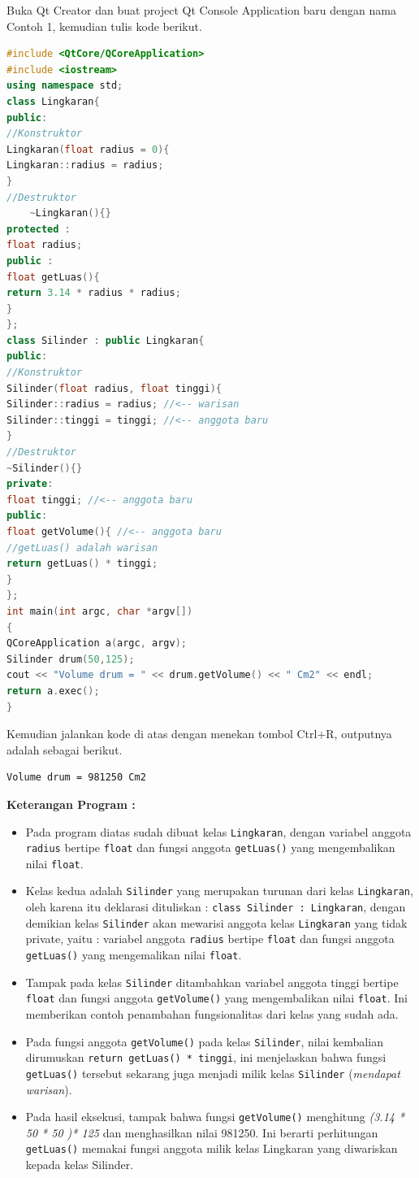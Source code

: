 Buka Qt Creator dan buat project Qt Console Application baru dengan nama
Contoh 1, kemudian tulis kode berikut.

\begin{lstlisting}[language=c++]
#include <QtCore/QCoreApplication>
#include <iostream>
using namespace std;
class Lingkaran{
public:
//Konstruktor
Lingkaran(float radius = 0){
Lingkaran::radius = radius;
}
//Destruktor
    ~Lingkaran(){}
protected :
float radius;
public :
float getLuas(){
return 3.14 * radius * radius;
}
};
class Silinder : public Lingkaran{
public:
//Konstruktor
Silinder(float radius, float tinggi){
Silinder::radius = radius; //<-- warisan
Silinder::tinggi = tinggi; //<-- anggota baru
}
//Destruktor
~Silinder(){}
private:
float tinggi; //<-- anggota baru
public:
float getVolume(){ //<-- anggota baru
//getLuas() adalah warisan
return getLuas() * tinggi;
}
};
int main(int argc, char *argv[])
{
QCoreApplication a(argc, argv);
Silinder drum(50,125);
cout << "Volume drum = " << drum.getVolume() << " Cm2" << endl;
return a.exec();
}
\end{lstlisting}

Kemudian jalankan kode di atas dengan menekan tombol Ctrl+R, outputnya
adalah sebagai berikut.

\begin{verbatim}
Volume drum = 981250 Cm2
\end{verbatim}

\textbf{Keterangan Program :}

\begin{itemize}
\tightlist
\item
  Pada program diatas sudah dibuat kelas \texttt{Lingkaran}, dengan
  variabel anggota \texttt{radius} bertipe \texttt{float} dan fungsi
  anggota \texttt{getLuas()} yang mengembalikan nilai \texttt{float}.
\item
  Kelas kedua adalah \texttt{Silinder} yang merupakan turunan dari kelas
  \texttt{Lingkaran}, oleh karena itu deklarasi dituliskan :
  \texttt{class\ Silinder\ :\ Lingkaran}, dengan demikian kelas
  \texttt{Silinder} akan mewarisi anggota kelas \texttt{Lingkaran} yang
  tidak private, yaitu : variabel anggota \texttt{radius} bertipe
  \texttt{float} dan fungsi anggota \texttt{getLuas()} yang mengemalikan
  nilai \texttt{float}.
\item
  Tampak pada kelas \texttt{Silinder} ditambahkan variabel anggota
  tinggi bertipe \texttt{float} dan fungsi anggota \texttt{getVolume()}
  yang mengembalikan nilai \texttt{float}. Ini memberikan contoh
  penambahan fungsionalitas dari kelas yang sudah ada.
\item
  Pada fungsi anggota \texttt{getVolume()} pada kelas \texttt{Silinder},
  nilai kembalian dirumuskan \texttt{return\ getLuas()\ *\ tinggi}, ini
  menjelaskan bahwa fungsi \texttt{getLuas()} tersebut sekarang juga
  menjadi milik kelas \texttt{Silinder} (\emph{mendapat warisan}).
\item
  Pada hasil eksekusi, tampak bahwa fungsi \texttt{getVolume()}
  menghitung \emph{(3.14 * 50 * 50 )* 125} dan menghasilkan nilai
  981250. Ini berarti perhitungan \texttt{getLuas()} memakai fungsi
  anggota milik kelas Lingkaran yang diwariskan kepada kelas Silinder.
\end{itemize}

